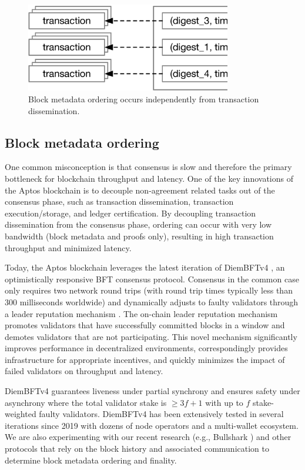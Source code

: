 \documentclass{article}
\begin{document}
\begin{figure}
\centering
\includegraphics[width=0.8\textwidth]{ordering.eps}
\caption{\label{fig:block}Block metadata ordering occurs independently from transaction dissemination.}
\end{figure}

\subsection{Block metadata ordering}
\label{subsec:block_metadata_ordering}

One common misconception is that consensus is slow and therefore the primary bottleneck for blockchain throughput and latency. One of the key innovations of the Aptos blockchain is to decouple non-agreement related tasks out of the consensus phase, such as transaction dissemination, transaction execution/storage, and ledger certification. By decoupling transaction dissemination from the consensus phase, ordering can occur with very low bandwidth (block metadata and proofs only), resulting in high transaction throughput and minimized latency.

Today, the Aptos blockchain leverages the latest iteration of DiemBFTv4 \cite{diembft_v4}, an optimistically responsive BFT consensus protocol. Consensus in the common case only requires two network round trips (with round trip times typically less than 300 milliseconds worldwide) and dynamically adjusts to faulty validators through a leader reputation mechanism \cite{be_aware}. The on-chain leader reputation mechanism promotes validators that have successfully committed blocks in a window and demotes validators that are not participating. This novel mechanism significantly improves performance in decentralized environments, correspondingly provides infrastructure for appropriate incentives, and quickly minimizes the impact of failed validators on throughput and latency.

DiemBFTv4 guarantees liveness under partial synchrony and ensures safety under asynchrony where the total validator stake is $\geq 3f+1$ with up to $f$ stake-weighted faulty validators. DiemBFTv4 has been extensively tested in several iterations since 2019 with dozens of node operators and a multi-wallet ecosystem. We are also experimenting with our recent research (e.g., Bullshark \cite{bullshark}) and other protocols that rely on the block history and associated communication to determine block metadata ordering and finality.
\end{document}
